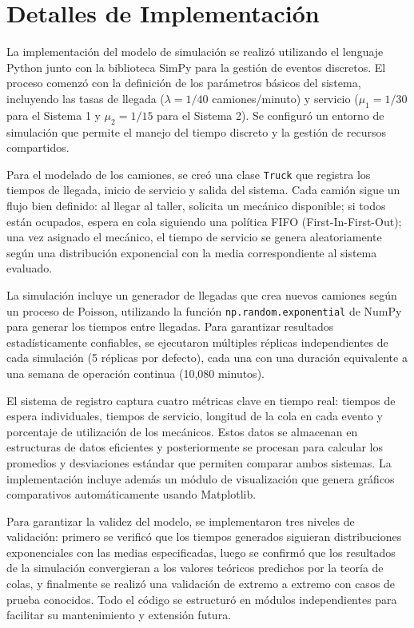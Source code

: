 \documentclass[a4paper, 12pt]{article}
\begin{document}
	
	\section{Detalles de Implementación}
	
	La implementación del modelo de simulación se realizó utilizando el lenguaje Python junto con la biblioteca SimPy para la gestión de eventos discretos. El proceso comenzó con la definición de los parámetros básicos del sistema, incluyendo las tasas de llegada ($\lambda = 1/40$ camiones/minuto) y servicio ($\mu_1 = 1/30$ para el Sistema 1 y $\mu_2 = 1/15$ para el Sistema 2). Se configuró un entorno de simulación que permite el manejo del tiempo discreto y la gestión de recursos compartidos.
	
	Para el modelado de los camiones, se creó una clase \texttt{Truck} que registra los tiempos de llegada, inicio de servicio y salida del sistema. Cada camión sigue un flujo bien definido: al llegar al taller, solicita un mecánico disponible; si todos están ocupados, espera en cola siguiendo una política FIFO (First-In-First-Out); una vez asignado el mecánico, el tiempo de servicio se genera aleatoriamente según una distribución exponencial con la media correspondiente al sistema evaluado.
	
	La simulación incluye un generador de llegadas que crea nuevos camiones según un proceso de Poisson, utilizando la función \texttt{np.random.exponential} de NumPy para generar los tiempos entre llegadas. Para garantizar resultados estadísticamente confiables, se ejecutaron múltiples réplicas independientes de cada simulación (5 réplicas por defecto), cada una con una duración equivalente a una semana de operación continua (10,080 minutos). 
	
	El sistema de registro captura cuatro métricas clave en tiempo real: tiempos de espera individuales, tiempos de servicio, longitud de la cola en cada evento y porcentaje de utilización de los mecánicos. Estos datos se almacenan en estructuras de datos eficientes y posteriormente se procesan para calcular los promedios y desviaciones estándar que permiten comparar ambos sistemas. La implementación incluye además un módulo de visualización que genera gráficos comparativos automáticamente usando Matplotlib.
	
	Para garantizar la validez del modelo, se implementaron tres niveles de validación: primero se verificó que los tiempos generados siguieran distribuciones exponenciales con las medias especificadas, luego se confirmó que los resultados de la simulación convergieran a los valores teóricos predichos por la teoría de colas, y finalmente se realizó una validación de extremo a extremo con casos de prueba conocidos. Todo el código se estructuró en módulos independientes para facilitar su mantenimiento y extensión futura.
	
\end{document}
